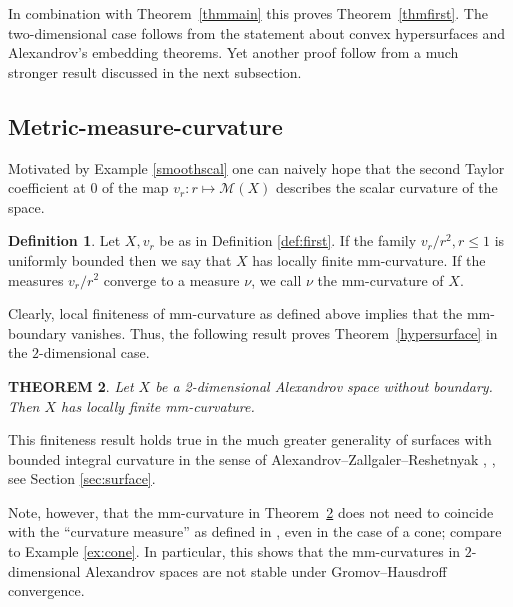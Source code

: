 \documentclass[12pt,leqno,intlimits]{amsart}
\numberwithin{equation}{section}
\newtheorem{thm}{THEOREM}[section]
\theoremstyle{definition}
\newtheorem{defn}[thm]{Definition}%
\theoremstyle{remark}
\newcommand{\tref}[1]{Theorem~\ref{#1}}
\begin{document}
In combination with \tref{thmmain} this proves \tref{thmfirst}.
The two-dimensional case follows from the statement about convex hypersurfaces and Alexandrov's embedding theorems.
Yet another proof follow from a much stronger result discussed in the next subsection.

\subsection{Metric-measure-curvature} \label{subsec:curv}
Motivated by Example \ref{smoothscal} one can naively hope that the second Taylor coefficient at $0$ of the
map $v_r\colon r\mapsto \mathcal M(X)$ describes the scalar curvature of the space.

\begin{defn}
Let $X,v_r$ be as in Definition \ref{def:first}.
If the family $v_r /r^2, r\leq 1$ is uniformly bounded then we say that $X$ has locally finite mm-curvature.
If the measures $v_r /r^2$ converge to a measure $\nu$, we call $\nu$ the mm-curvature of $X$.
\end{defn}

Clearly, local finiteness of mm-curvature as defined above implies that the mm-boundary vanishes.
Thus, the following result proves \tref{hypersurface} in the $2$-dimensional case.

\begin{thm} \label{intsurface}
Let $X$ be a 2-dimensional Alexandrov space without boundary.
Then $X$ has locally finite mm-curvature.
\end{thm}

This finiteness result holds true in the much greater generality of surfaces with bounded integral curvature in the sense of Alexandrov--Zallgaler--Reshetnyak \cite{Reshetnyak-GeomIV}, \cite{AZ}, see Section \ref{sec:surface}.

Note, however, that the mm-curvature
in \tref{intsurface} does not need to coincide with the ``curvature measure'' as defined in \cite{AZ}, even in the case of a cone; compare to Example \ref{ex:cone}.
In particular, this shows that the mm-curvatures in $2$-dimensional Alexandrov spaces are not stable under Gromov--Hausdroff convergence.
\end{document}
